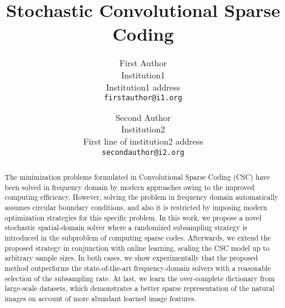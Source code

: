 \documentclass[10pt,twocolumn,letterpaper]{article}
\begin{document}
\title{Stochastic Convolutional Sparse Coding}

\author{First Author\\
Institution1\\
Institution1 address\\
{\tt\small firstauthor@i1.org}
\and
Second Author\\
Institution2\\
First line of institution2 address\\
{\tt\small secondauthor@i2.org}
}

\maketitle

\begin{abstract}
The minimization problems formulated in Convolutional Sparse Coding (CSC) have been solved in frequency domain by modern approaches owing to the improved computing efficiency. However, solving the problem in frequency domain automatically assumes circular boundary conditions, and also it is restricted by imposing modern optimization strategies for this specific problem. In this work, we propose a novel stochastic spatial-domain solver where a randomized subsampling strategy is introduced in the subproblem of computing sparse codes. Afterwards, we extend the proposed strategy in conjunction with online learning, scaling the CSC model up to arbitrary sample sizes. In both cases, we show experimentally that the proposed method outperforms the state-of-the-art frequency-domain solvers with a reasonable selection of the subsampling rate. At last, we learn the over-complete dictionary from large-scale datasets, which demonstrates a better sparse representation of the natural images on account of more abundant learned image features.
\end{abstract}











{\small


}

\clearpage
\appendix


\end{document}
